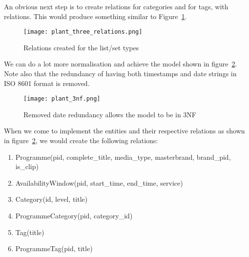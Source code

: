 \documentclass[11pt,a4paper]{article}
\begin{document}
An obvious next step is to create relations for categories and for tags,
with relations. This would produce something similar to
Figure~\ref{fig:cat-tags-rel}.

\begin{comment}
  @startuml plant_three_relations.png
  class Programme {
    pid
    start_time
    end_time
    epoch_start
    epoch_end
    complete_title
    media_type
    masterbrand
    service
    brand_pid
    is_clip
  }
  class Category {
    id
    level
    title
  }
  class Tag {
    title
  }
  Programme "0..*" -r- "0..*" Category
  Programme "0..*" -l- "0..*" Tag
  @enduml
\end{comment}
\begin{figure}[p]
  \begin{center}
    \texttt{[image: plant\_three\_relations.png]}
  \end{center}
  \caption{Relations created for the list/set types}
  \label{fig:cat-tags-rel}
\end{figure}

We can do a lot more normalisation and achieve the model shown in
figure~\ref{fig:3nf}. Note also that the redundancy of having both
timestamps and date strings in ISO 8601 format is removed.

\begin{comment}
  @startuml plant_3nf.png
  class Programme {
    pid : varchar
    complete_title : varchar
    media_type : enum ('video, 'audio')
    masterbrand : varchar
    brand_pid : varchar
    is_clip : boolean
  }
  class AvailabilityWindow {
    start_time : timestamp
    end_time : timestamp
    service : varchar
  }
  class Category {
    id : varchar
    level : smallint
    title : varchar
  }
  class Tag {
    title : varchar
  }
  Programme "1" -d- "0..*" AvailabilityWindow
  Programme "0..*" -r- "0..*" Category
  Programme "0..*" -l- "0..*" Tag
  @enduml
\end{comment}
\begin{figure}[p]
  \begin{center}
    \texttt{[image: plant\_3nf.png]}
  \end{center}
  \caption{Removed date redundancy allows the model to be in 3NF}
  \label{fig:3nf}
\end{figure}

When we come to implement the entities and their respective relations
as shown in figure~\ref{fig:3nf}, we would create the following relations:

\begin{enumerate}
  \item Programme(pid, complete\_title, media\_type, masterbrand, brand\_pid, is\_clip)
  \item AvailabilityWindow(pid, start\_time, end\_time, service)
  \item Category(id, level, title)
  \item ProgrammeCategory(pid, category\_id)
  \item Tag(title)
  \item ProgrammeTag(pid, title)
\end{enumerate}
\end{document}
